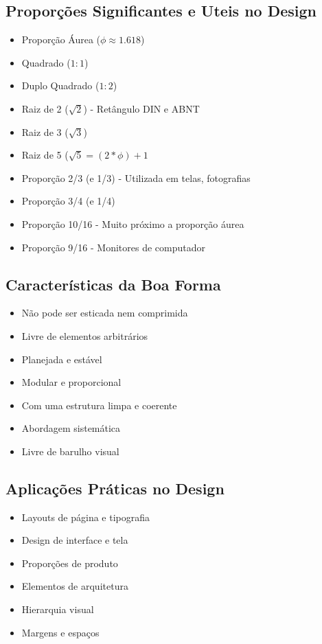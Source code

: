 \documentclass{article}
\begin{document}
\subsection{Proporções Significantes e Uteis no Design}
\begin{itemize}
    \item Proporção Áurea ($\phi \approx 1.618$)
    \item Quadrado ($1:1$)
    \item Duplo Quadrado ($1:2$)
    \item Raiz de 2 ($\sqrt{2}$) - Retângulo DIN e ABNT
    \item Raiz de 3 ($\sqrt{3}$)
    \item Raiz de 5 ($\sqrt{5} = (2*\phi) + 1$
    \item Proporção 2/3 (e 1/3) - Utilizada em telas, fotografias
    \item Proporção 3/4 (e 1/4)
    \item Proporção 10/16 - Muito próximo a proporção áurea
    \item Proporção 9/16 - Monitores de computador
\end{itemize}

\subsection{Características da Boa Forma}
\begin{itemize}
    \item Não pode ser esticada nem comprimida
    \item Livre de elementos arbitrários
    \item Planejada e estável
    \item Modular e proporcional
    \item Com uma estrutura limpa e coerente
    \item Abordagem sistemática
    \item Livre de barulho visual 
\end{itemize}

\subsection{Aplicações Práticas no Design}
\begin{itemize}
    \item Layouts de página e tipografia
    \item Design de interface e tela
    \item Proporções de produto
    \item Elementos de arquitetura
    \item Hierarquia visual
    \item Margens e espaços
\end{itemize}
\end{document}
